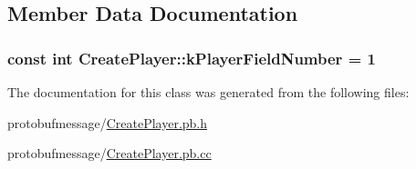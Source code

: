 \subsection{Member Data Documentation}
\hypertarget{class_create_player_a301c293ca078a99b8fe8aeaa5e269aa2}{
\subsubsection[{k\-Player\-Field\-Number}]{\setlength{\rightskip}{0pt plus 5cm}const int Create\-Player\-::k\-Player\-Field\-Number = 1\hspace{0.3cm}{\ttfamily [static]}}}\label{class_create_player_a301c293ca078a99b8fe8aeaa5e269aa2}


The documentation for this class was generated from the following files\-:\begin{DoxyCompactItemize}
\item 
protobufmessage/\hyperlink{_create_player_8pb_8h}{Create\-Player.\-pb.\-h}\item 
protobufmessage/\hyperlink{_create_player_8pb_8cc}{Create\-Player.\-pb.\-cc}\end{DoxyCompactItemize}
